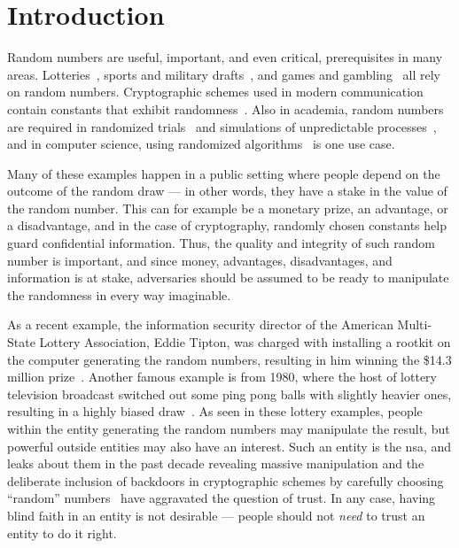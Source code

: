 \section{Introduction}\label{cha:introduction}

Random numbers are useful, important, and even critical, prerequisites in many areas.
Lotteries~\cite{grumbach2017distributed}, sports and military drafts~\cite{nbalottery, starr1997nonrandom}, and games and gambling~\cite{randomnumbersgames} all rely on random numbers.
Cryptographic schemes used in modern communication contain constants that exhibit randomness~\cite{baigneres2015trap}.
Also in academia, random numbers are required in randomized trials~\cite{kim2014random} and simulations of unpredictable processes~\cite{heath2002scientific}, and in computer science, using randomized algorithms~\cite{cormen2009introduction} is one use case.

Many of these examples happen in a public setting where people depend on the outcome of the random draw --- in other words, they have a stake in the value of the random number.
This can for example be a monetary prize, an advantage, or a disadvantage, and in the case of cryptography, randomly chosen constants help guard confidential information.
Thus, the quality and integrity of such random number is important, and since money, advantages, disadvantages, and information is at stake, adversaries should be assumed to be ready to manipulate the randomness in every way imaginable.

As a recent example, the information security director of the American Multi-State Lottery Association, Eddie Tipton, was charged with installing a rootkit on the computer generating the random numbers, resulting in him winning the \$14.3 million prize~\cite{lotteryscandal-eddietipton}.
Another famous example is from 1980, where the host of lottery television broadcast switched out some ping pong balls with slightly heavier ones, resulting in a highly biased draw~\cite{lotteryscandal-666}.
As seen in these lottery examples, people within the entity generating the random numbers may manipulate the result, but powerful outside entities may also have an interest.
Such an entity is the \gls{nsa}, and leaks about them in the past decade revealing massive manipulation and the deliberate inclusion of backdoors in cryptographic schemes by carefully choosing \enquote{random} numbers~\cite{nytimes-nsaconstants,nytimes-nsabackdoors} have aggravated the question of trust.
In any case, having blind faith in an entity is not desirable --- people should not \emph{need} to trust an entity to do it right.

